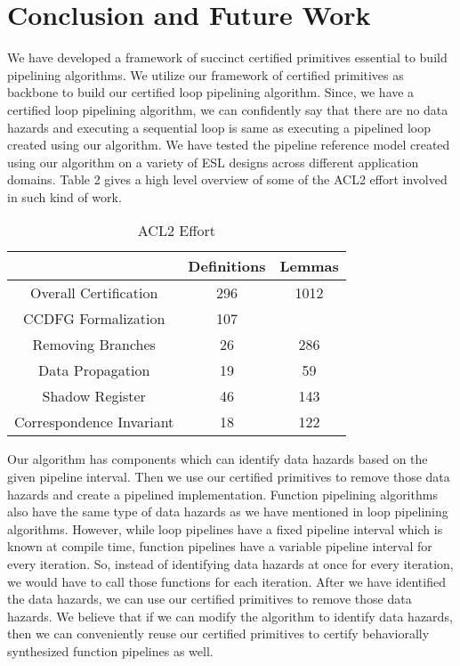 \section{Conclusion and Future Work}
\label{sec:research-plan}

We have developed a framework of succinct certified primitives essential to build pipelining algorithms. We utilize our framework of certified primitives as backbone to build our certified loop pipelining algorithm. Since, we have a certified loop pipelining algorithm, we can confidently say that there are no data hazards and executing a sequential loop is same as executing a pipelined loop created using our algorithm. We have tested the pipeline reference model created using our algorithm on a variety of ESL designs across different application domains. Table 2 gives a high level overview of some of the ACL2 effort involved in such kind of work. %

\begin{table}
  \centering
  \label{fig:proof}
  \begin{tabular}{| c || c | c |}
    \hline
    & Definitions & Lemmas \\
    \hline
    Overall Certification & 296 & 1012 \\
    \hline
    CCDFG Formalization & 107 &  \\
    \hline
    Removing Branches & 26 & 286 \\ 
    \hline
    Data Propagation & 19 & 59 \\ 
    \hline
    Shadow Register & 46 & 143 \\
    \hline
    Correspondence Invariant & 18 & 122 \\ 
    \hline
  \end{tabular}
        \caption{ACL2 Effort}
\end{table}

Our algorithm has components which can identify data hazards based on the given pipeline interval. Then we use our certified primitives to remove those data hazards and create a pipelined implementation. Function pipelining algorithms also have the same type of data hazards as we have mentioned in loop pipelining algorithms. However, while loop pipelines have a fixed pipeline interval which is known at compile time, function pipelines have a variable pipeline interval for every iteration. So, instead of identifying data hazards at once for every iteration, we would have to call those functions for each iteration. After we have identified the data hazards, we can use our certified primitives to remove those data hazards. We believe that if we can modify the algorithm to identify data hazards, then we can conveniently reuse our certified primitives to certify behaviorally synthesized function pipelines as well.     